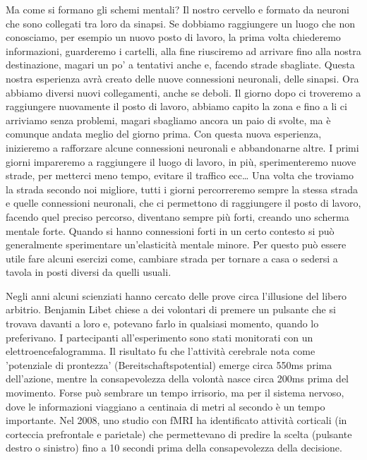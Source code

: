 \documentclass[12pt]{book} %
\begin{document}
Ma come si formano gli schemi mentali? Il nostro cervello e formato da neuroni che sono collegati tra loro da sinapsi. Se dobbiamo
raggiungere un luogo che non conosciamo, per esempio un nuovo posto di lavoro, la prima volta chiederemo informazioni,
guarderemo i cartelli, alla fine riusciremo ad arrivare fino alla nostra destinazione, magari un po' a tentativi anche
e, facendo strade sbagliate. Questa nostra esperienza avrà creato delle nuove connessioni neuronali, delle sinapsi. Ora
abbiamo diversi nuovi collegamenti, anche se deboli. Il giorno dopo ci troveremo a raggiungere nuovamente il posto di
lavoro, abbiamo capito la zona e fino a li ci arriviamo senza problemi, magari sbagliamo ancora un paio di svolte, ma è
comunque andata meglio del giorno prima. Con questa nuova esperienza, inizieremo a rafforzare alcune connessioni
neuronali e abbandonarne altre. I primi giorni impareremo a raggiungere il luogo di lavoro, in più, sperimenteremo
nuove strade, per metterci meno tempo, evitare il traffico ecc… Una volta che troviamo la strada secondo noi migliore,
tutti i giorni percorreremo sempre la stessa strada e quelle connessioni neuronali, che ci permettono di raggiungere il
posto di lavoro, facendo quel preciso percorso, diventano sempre più forti, creando uno scherma mentale forte. Quando
si hanno connessioni forti in un certo contesto si può generalmente sperimentare un'elasticità mentale minore. Per questo può essere utile fare alcuni esercizi come,
cambiare strada per tornare a casa o sedersi a tavola in posti diversi da quelli usuali.

Negli anni alcuni scienziati hanno cercato delle prove circa l'illusione del libero arbitrio.
Benjamin Libet chiese a dei volontari di premere un pulsante che si trovava davanti a loro e, potevano farlo in
qualsiasi momento, quando lo preferivano. I partecipanti all'esperimento sono stati monitorati con
un elettroencefalogramma. Il risultato fu che l'attività cerebrale nota come 'potenziale di prontezza' (Bereitschaftspotential) emerge circa 550ms prima dell’azione, mentre la consapevolezza della volontà nasce circa 200ms prima del movimento.
Forse può sembrare un tempo irrisorio, ma per il sistema nervoso, dove le informazioni viaggiano a centinaia di metri
al secondo è un tempo importante. Nel 2008, uno studio con fMRI ha identificato attività corticali (in corteccia prefrontale e parietale) che permettevano di predire la scelta (pulsante destro o sinistro) fino a 10 secondi prima della consapevolezza della decisione.
 
\end{document}
